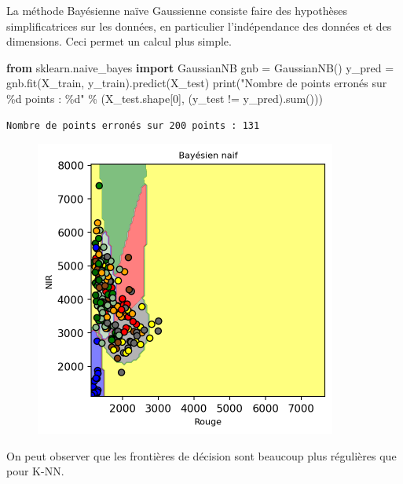 \documentclass[
]{article}
\newenvironment{Shaded}{}{}
\newcommand{\BuiltInTok}[1]{\textcolor[rgb]{0.00,0.50,0.00}{#1}}
\newcommand{\DecValTok}[1]{\textcolor[rgb]{0.25,0.63,0.44}{#1}}
\newcommand{\ImportTok}[1]{\textcolor[rgb]{0.00,0.50,0.00}{\textbf{#1}}}
\newcommand{\NormalTok}[1]{#1}
\newcommand{\OperatorTok}[1]{\textcolor[rgb]{0.40,0.40,0.40}{#1}}
\newcommand{\SpecialCharTok}[1]{\textcolor[rgb]{0.25,0.44,0.63}{#1}}
\newcommand{\StringTok}[1]{\textcolor[rgb]{0.25,0.44,0.63}{#1}}
\begin{document}
La méthode Bayésienne naïve Gaussienne consiste faire des hypothèses
simplificatrices sur les données, en particulier l'indépendance des
données et des dimensions. Ceci permet un calcul plus simple.

\label{4b596e68}
\label{cb43}
\begin{Shaded}
\begin{Highlighting}[]
\ImportTok{from}\NormalTok{ sklearn.naive\_bayes }\ImportTok{import}\NormalTok{ GaussianNB}
\NormalTok{gnb }\OperatorTok{=}\NormalTok{ GaussianNB()}
\NormalTok{y\_pred }\OperatorTok{=}\NormalTok{ gnb.fit(X\_train, y\_train).predict(X\_test)}
\BuiltInTok{print}\NormalTok{(}\StringTok{"Nombre de points erronés sur }\SpecialCharTok{\%d}\StringTok{ points : }\SpecialCharTok{\%d}\StringTok{"}
      \OperatorTok{\%}\NormalTok{ (X\_test.shape[}\DecValTok{0}\NormalTok{], (y\_test }\OperatorTok{!=}\NormalTok{ y\_pred).}\BuiltInTok{sum}\NormalTok{()))}
\end{Highlighting}
\end{Shaded}

\begin{verbatim}
Nombre de points erronés sur 200 points : 131
\end{verbatim}

\label{ae124bd9}
\begin{figure}
\centering
\includegraphics[width=3.90625in,height=3.84375in]{05-ClassificationsSupervisees_files/figure-html/cell-42-output-1.png}
\caption{}
\end{figure}

On peut observer que les frontières de décision sont beaucoup plus
régulières que pour K-NN.
\end{document}
